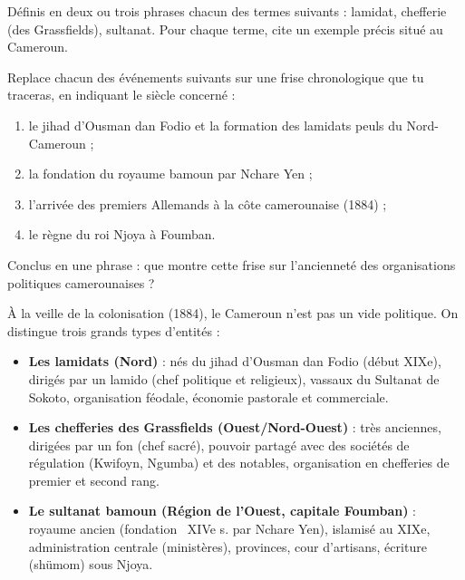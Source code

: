 \documentclass[11pt]{article}
\newcommand{\cle}[1]{{\popxbold\color{popdark}#1}}
\newcounter{popsec}
\newcounter{popsub}
\newcommand{\courssub}[1]{%
  \stepcounter{popsub}%
  \par\vspace{9pt}\noindent{\popxbold\fontsize{11.5}{13}\selectfont\color{popink}{\color{poporange}\thepopsec.\thepopsub}\hspace{6pt}#1}\par\nopagebreak\vspace{4pt}
}
\begin{document}
\begin{exercice}[Définitions]
Définis en deux ou trois phrases chacun des termes suivants : \cle{lamidat}, \cle{chefferie} (des Grassfields), \cle{sultanat}. Pour chaque terme, cite un exemple précis situé au Cameroun.
\end{exercice}

\begin{exercice}
Replace chacun des événements suivants sur une frise chronologique que tu traceras, en indiquant le siècle concerné :
\begin{enumerate}
\item le jihad d'Ousman dan Fodio et la formation des lamidats peuls du Nord-Cameroun ;
\item la fondation du royaume bamoun par Nchare Yen ;
\item l'arrivée des premiers Allemands à la côte camerounaise (1884) ;
\item le règne du roi Njoya à Foumban.
\end{enumerate}
Conclus en une phrase : que montre cette frise sur l'ancienneté des organisations politiques camerounaises ?
\end{exercice}

\begin{aretenir}
À la veille de la colonisation (1884), le Cameroun n'est pas un vide politique. On distingue trois grands types d'entités :
\begin{itemize}
\item \textbf{Les lamidats (Nord)} : nés du jihad d'Ousman dan Fodio (début XIXe), dirigés par un \cle{lamido} (chef politique et religieux), vassaux du Sultanat de Sokoto, organisation féodale, économie pastorale et commerciale.
\item \textbf{Les chefferies des Grassfields (Ouest/Nord-Ouest)} : très anciennes, dirigées par un \cle{fon} (chef sacré), pouvoir partagé avec des sociétés de régulation (Kwifoyn, Ngumba) et des notables, organisation en chefferies de premier et second rang.
\item \textbf{Le sultanat bamoun (Région de l'Ouest, capitale Foumban)} : royaume ancien (fondation ~XIVe s. par Nchare Yen), islamisé au XIXe, administration centrale (ministères), provinces, cour d'artisans, écriture (shümom) sous Njoya.
\end{itemize}
\end{aretenir}

\courssub{Je m'entraîne}
\end{document}
